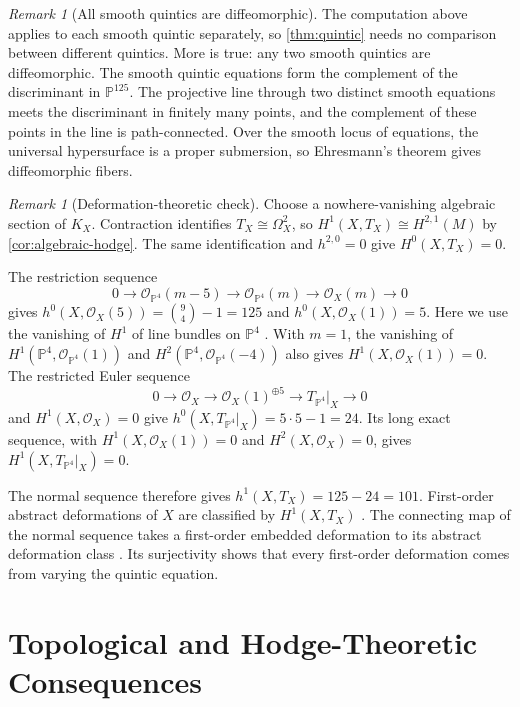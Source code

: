 \documentclass[11pt,reqno]{amsart}
\theoremstyle{definition}
\theoremstyle{remark}
\newtheorem{remark}[theorem]{Remark}
\newcommand{\PP}{\mathbb{P}}
\newcommand{\OO}{\mathcal{O}}
\begin{document}
\begin{remark}[All smooth quintics are diffeomorphic]
\label{rem:quintic-diffeo}
The computation above applies to each smooth quintic separately, so
\cref{thm:quintic} needs no comparison between different quintics. More is
true: any two smooth quintics are diffeomorphic. The smooth quintic
equations form the complement of the discriminant in $\PP^{125}$. The
projective line through two distinct smooth equations meets the
discriminant in finitely many points, and the complement of these points
in the line is path-connected. Over the smooth locus of equations, the
universal hypersurface is a proper submersion, so Ehresmann's theorem
gives diffeomorphic fibers.
\end{remark}

\begin{remark}[Deformation-theoretic check]
\label{rem:moduli}
Choose a nowhere-vanishing algebraic section of $K_X$. Contraction
identifies $T_X\cong\Omega_X^2$, so $H^1(X,T_X)\cong H^{2,1}(M)$ by
\cref{cor:algebraic-hodge}. The same identification and $h^{2,0}=0$
give $H^0(X,T_X)=0$.

The restriction sequence
\[
0\longrightarrow\OO_{\PP^4}(m-5)\longrightarrow\OO_{\PP^4}(m)
\longrightarrow\OO_X(m)\longrightarrow0
\]
gives $h^0(X,\OO_X(5))=\binom{9}{4}-1=125$ and
$h^0(X,\OO_X(1))=5$. Here we use the vanishing of $H^1$ of line bundles
on $\PP^4$ \cite[Ch.~III, \S5]{hartshorne1977}. With $m=1$, the vanishing of
$H^1(\PP^4,\OO_{\PP^4}(1))$ and $H^2(\PP^4,\OO_{\PP^4}(-4))$ also gives
$H^1(X,\OO_X(1))=0$. The restricted Euler sequence
\[
0\longrightarrow\OO_X\longrightarrow\OO_X(1)^{\oplus5}
\longrightarrow T_{\PP^4}|_X\longrightarrow0
\]
and $H^1(X,\OO_X)=0$ give $h^0(X,T_{\PP^4}|_X)=5\cdot5-1=24$.
Its long exact sequence, with $H^1(X,\OO_X(1))=0$ and $H^2(X,\OO_X)=0$,
gives $H^1(X,T_{\PP^4}|_X)=0$.

The normal sequence therefore gives $h^1(X,T_X)=125-24=101$.
First-order abstract deformations of $X$ are classified by $H^1(X,T_X)$
\cite[Ch.~6]{huybrechts2005complex}. The connecting map of the normal
sequence takes a first-order embedded deformation to its abstract
deformation class \cite[Ch.~3]{sernesi2006}. Its surjectivity shows that
every first-order deformation comes from varying the quintic equation.
\end{remark}

\section{Topological and Hodge-Theoretic Consequences}
\label{sec:consequences}
\end{document}

